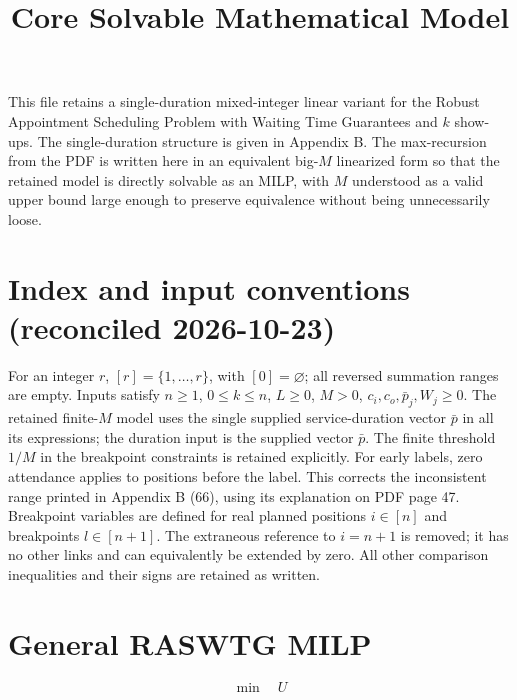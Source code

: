 \documentclass{article}
\title{Core Solvable Mathematical Model}
\author{}
\date{}
\begin{document}
\maketitle

This file retains a single-duration mixed-integer linear variant for the Robust Appointment Scheduling Problem with Waiting Time Guarantees and \(k\) show-ups. The single-duration structure is given in Appendix B. The max-recursion from the PDF is written here in an equivalent big-\(M\) linearized form so that the retained model is directly solvable as an MILP, with \(M\) understood as a valid upper bound large enough to preserve equivalence without being unnecessarily loose.


\section*{Index and input conventions (reconciled 2026-10-23)}
For an integer $r$, $[r]=\{1,\ldots,r\}$, with $[0]=\varnothing$;
all reversed summation ranges are empty. Inputs satisfy $n\ge1$, $0\le k\le n$,
$L\ge0$, $M>0$, $c_i,c_o,\bar p_j,W_j\ge0$.
The retained finite-$M$ model uses the single supplied service-duration vector
$\bar p$ in all its expressions; the duration input is the supplied vector $\bar p$.
The finite threshold $1/M$ in the breakpoint constraints is retained explicitly.
For early labels, zero attendance applies to positions before the label. This corrects the inconsistent range printed in Appendix
B (66), using its explanation on PDF page 47.
Breakpoint variables are defined for real planned positions $i\in[n]$ and
breakpoints $l\in[n+1]$. The extraneous reference to $i=n+1$ is removed;
it has no other links and can equivalently be extended by zero.
All other comparison inequalities and their signs are retained as written.

\section{General RASWTG MILP}

\begin{equation}
\min \quad U
\tag{58}
\end{equation}
\end{document}
